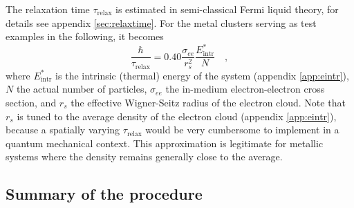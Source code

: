 \documentclass[final,1p]{elsarticle}
\newcommand{\PGR}[1]{{\color{blue} #1}}
\begin{document}
The relaxation time $\tau_\mathrm{relax}$ is estimated in
semi-classical Fermi liquid theory, for details see appendix
\ref{sec:relaxtime}. For the metal clusters serving as test examples
in the following, it becomes
\begin{equation}
  \frac{\hbar}{\tau_\mathrm{relax}}
  =
  {0.40}\frac{\sigma_{ee}}{r_s^2}\frac{{E}^*_\mathrm{intr}}{N}
  \quad,
\label{eq:relaxtime}
\end{equation}
where $E^*_\mathrm{intr}$ is the intrinsic (thermal) energy of the
system (appendix \ref{app:eintr}), $N$ the actual number of particles,
$\sigma_{ee}$ the in-medium electron-electron cross section, and $r_s$
the effective Wigner-Seitz radius of the electron cloud.  \PGR{Note
  that $r_s$ is tuned to the average density of the electron cloud (appendix
  \ref{app:eintr}), because a spatially varying $\tau_\mathrm{relax}$
  would be very cumbersome to implement in a quantum mechanical
  context. This approximation is legitimate for metallic systems where
  the density remains generally close to the average.}


\subsection{Summary of the procedure}
\label{sec:summary}
\end{document}
